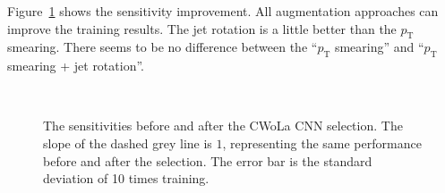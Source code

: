 \documentclass[12pt]{article}
\begin{document}
		Figure~\ref{fig:sensitivity_improvement_origin_pt_jet_aug_3} shows the sensitivity improvement. All augmentation approaches can improve the training results. The jet rotation is a little better than the $p_{\text{T}}$ smearing. There seems to be no difference between the ``$p_{\text{T}}$ smearing'' and ``$p_{\text{T}}$ smearing + jet rotation''.
		\begin{figure}[htpb]
			\centering
			 \\
			\caption{The sensitivities before and after the CWoLa CNN selection. The slope of the dashed grey line is $1$, representing the same performance before and after the selection. The error bar is the standard deviation of 10 times training.}
			\label{fig:sensitivity_improvement_origin_pt_jet_aug_3}
		\end{figure}
\end{document}
